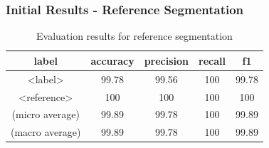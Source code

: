 \documentclass{beamer}
\begin{document}

\begin{frame}
\frametitle{Initial Results - Reference Segmentation}
\begin{center}
\begingroup

\fontsize{8pt}{10pt}\selectfont
\begin{table}[h]
\begin{tabular}{ccccc}
\hline
label		&accuracy	&precision	&recall		&f1 \\
\hline
<label>		&99.78		&99.56		&100		&99.78\\
<reference>		&100		&100		&100		&100\\
\hline
(micro average) & 99.89		&99.78		&100		&99.89	\\
(macro average) &	99.89 & 99.78	& 100 & 99.89	\\
\hline
\end{tabular}
\caption[Table caption text]{Evaluation results for reference segmentation}
\end{table}

\endgroup
\end{center}

\end{frame}

\end{document}
